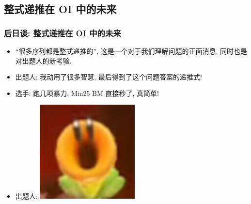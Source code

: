 \documentclass{ctexbeamer}
\begin{document}
\subsection{整式递推在 OI 中的未来}

\begin{frame}
  \frametitle{后日谈: 整式递推在 OI 中的未来}

  \begin{itemize}
    \item<1-> ``很多序列都是整式递推的'', 这是一个对于我们理解问题的正面消息, 同时也是对出题人的新考验.
    \item<2-> 出题人: 我动用了很多智慧, 最后得到了这个问题答案的递推式!
    \item<3-> 选手: 跑几项暴力, Min25 BM 直接秒了, 真简单!
    \item<4-> 出题人: \includegraphics[scale=0.2]{woc.jpg}
  \end{itemize}

\end{frame}
\end{document}
